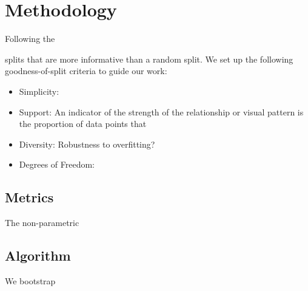 \section{Methodology}
Following the 

splits that are more informative than a random split.
We set up the following goodness-of-split criteria to guide our work:
\begin{itemize}
\item Simplicity:
\item Support: An indicator of the strength of the relationship or visual pattern is the proportion of data points that 
\item Diversity: Robustness to overfitting?
\item Degrees of Freedom:
\end{itemize}

\subsection{Metrics}
The 
non-parametric

\subsection{Algorithm}
We bootstrap



